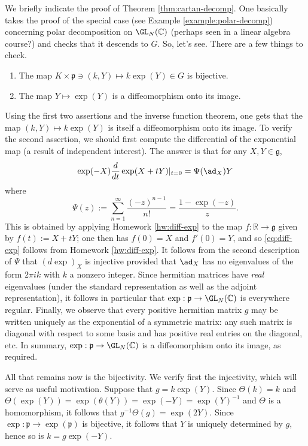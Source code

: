 \documentclass[reqno]{amsart} 
\begin{document}
We briefly indicate the proof of Theorem \ref{thm:cartan-decomp}.  One basically takes the proof of the special case (see Example \ref{example:polar-decomp}) concerning polar decomposition on $\GL_N(\mathbb{C})$ (perhaps seen in a linear algebra course?)  and checks that it descends to $G$.  So, let's see.  There are a few things to check.
\begin{enumerate}
\item The map $K \times \mathfrak{p} \ni (k,Y) \mapsto k \exp(Y) \in G$ is bijective.
\item The map $Y \mapsto \exp(Y)$ is a diffeomorphism onto its image.
\end{enumerate}
Using the first two assertions and the inverse function theorem, one gets that the map $(k,Y) \mapsto k \exp(Y)$ is itself a diffeomorphism onto its image.  To verify the second assertion, we should first compute the differential of the exponential map (a result of independent interest).  The answer is that for any $X,Y \in \mathfrak{g}$,
\begin{equation}\label{eq:diff-exp}
  \exp(-X) \frac{d}{d t} \exp(X + t Y)|_{t=0}
  =
  \Psi(\ad_X) Y
\end{equation}
where
\begin{equation*}
  \Psi(z) := \sum_{n=1}^{\infty} \frac{(-z)^{n-1}}{n!}  = \frac{1 - \exp(-z)}{z}.
\end{equation*}
This is obtained by applying Homework \ref{hw:diff-exp} to the map $f : \mathbb{R} \rightarrow \mathfrak{g}$ given by $f(t) := X + t Y$; one then has $f(0) = X$ and $f'(0) = Y$, and so \eqref{eq:diff-exp} follows from Homework \ref{hw:diff-exp}.  It follows from the second description of $\Psi$ that $(d \exp)_X$ is injective provided that $\ad_X$ has no eigenvalues of the form $2 \pi i k$ with $k$ a nonzero integer.  Since hermitian matrices have \emph{real} eigenvalues (under the standard representation as well as the adjoint representation), it follows in particular that $\exp : \mathfrak{p} \rightarrow \GL_N(\mathbb{C})$ is everywhere regular.  Finally, we observe that every positive hermitian matrix $g$ may be written uniquely as the exponential of a symmetric matrix: any such matrix is diagonal with respect to some basis and has positive real entries on the diagonal, etc.  In summary, $\exp : \mathfrak{p} \rightarrow \GL_N(\mathbb{C})$ is a diffeomorphism onto its image, as required.

All that remains now is the bijectivity.  We verify first the injectivity, which will serve as useful motivation.  Suppose that $g = k \exp(Y)$.  Since $\Theta(k) = k$ and $\Theta(\exp(Y)) = \exp(\theta(Y)) = \exp(-Y) = \exp(Y)^{-1}$ and $\Theta$ is a homomorphism, it follows that $g^{-1} \Theta(g) = \exp(2 Y)$.  Since $\exp : \mathfrak{p} \rightarrow \exp(\mathfrak{p})$ is bijective, it follows that $Y$ is uniquely determined by $g$, hence so is $k = g \exp(-Y)$.
\end{document}
